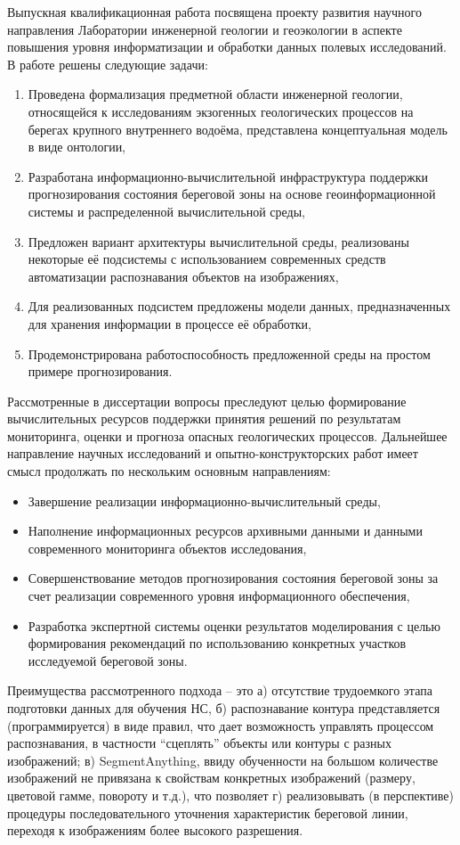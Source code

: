 \documentclass[732,fontsize=14pt,final]{studrep}
\begin{document}
Выпускная квалификационная работа посвящена проекту развития научного направления Лаборатории инженерной геологии и геоэкологии в аспекте повышения уровня информатизации и обработки данных полевых исследований. В работе решены следующие задачи:
\begin{enumerate}
  \item Проведена формализация предметной области инженерной геологии, относящейся к исследованиям экзогенных геологических процессов на берегах крупного внутреннего водоёма, представлена концептуальная модель в виде онтологии,
  \item Разработана информационно-вычислительной инфраструктура поддержки прогнозирования состояния береговой зоны на основе геоинформационной системы и распределенной вычислительной среды,
  \item Предложен вариант архитектуры вычислительной среды,  реализованы некоторые её подсистемы с использованием современных средств автоматизации распознавания объектов на изображениях,
  \item Для реализованных подсистем предложены модели данных, предназначенных для хранения информации в процессе её обработки,
  \item Продемонстрирована работоспособность предложенной среды на простом примере прогнозирования.
\end{enumerate}

Рассмотренные в диссертации вопросы преследуют целью формирование вычислительных ресурсов поддержки принятия решений по результатам мониторинга, оценки и прогноза опасных геологических процессов. Дальнейшее направление научных исследований и опытно-конструкторских работ имеет смысл продолжать по нескольким основным направлениям:
\begin{itemize}
  \item Завершение реализации информационно-вычислительный среды,
  \item Наполнение информационных ресурсов архивными данными и данными современного мониторинга объектов исследования,
  \item Совершенствование методов прогнозирования состояния береговой зоны за счет реализации современного уровня информационного обеспечения,
  \item Разработка экспертной системы оценки результатов моделирования с целью формирования рекомендаций по использованию конкретных участков исследуемой береговой зоны.
\end{itemize}

Преимущества рассмотренного подхода -- это а) отсутствие трудоемкого этапа подготовки данных для обучения НС, б) распознавание контура представляется (программируется) в виде правил, что дает возможность управлять процессом распознавания, в частности “сцеплять” объекты или контуры с разных изображений; в) SegmentAnything, ввиду обученности на большом количестве изображений не привязана к свойствам конкретных изображений (размеру, цветовой гамме, повороту и т.д.), что позволяет г) реализовывать (в перспективе) процедуры последовательного уточнения характеристик береговой линии, переходя к изображениям более высокого разрешения.
\end{document}
